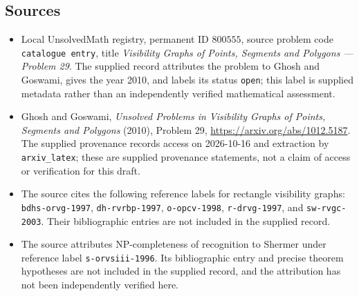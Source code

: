 \documentclass[11pt]{article}
\begin{document}
\subsection{Sources}
\begin{itemize}
\item Local UnsolvedMath registry, permanent ID \(800555\), source problem code \texttt{catalogue entry}, title \emph{Visibility Graphs of Points, Segments and Polygons --- Problem 29}. The supplied record attributes the problem to Ghosh and Goswami, gives the year 2010, and labels its status \texttt{open}; this label is supplied metadata rather than an independently verified mathematical assessment.
\item Ghosh and Goswami, \emph{Unsolved Problems in Visibility Graphs of Points, Segments and Polygons} (2010), Problem 29, \url{https://arxiv.org/abs/1012.5187}. The supplied provenance records access on 2026-10-16 and extraction by \texttt{arxiv\_latex}; these are supplied provenance statements, not a claim of access or verification for this draft.
\item The source cites the following reference labels for rectangle visibility graphs: \texttt{bdhs-orvg-1997}, \texttt{dh-rvrbp-1997}, \texttt{o-opcv-1998}, \texttt{r-drvg-1997}, and \texttt{sw-rvgc-2003}. Their bibliographic entries are not included in the supplied record.
\item The source attributes NP-completeness of recognition to Shermer under reference label \texttt{s-orvsiii-1996}. Its bibliographic entry and precise theorem hypotheses are not included in the supplied record, and the attribution has not been independently verified here.
\end{itemize}
\end{document}

